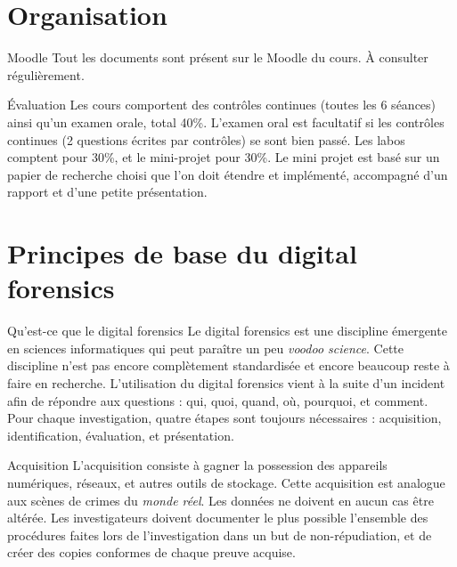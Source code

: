 \documentclass[a4paper]{article}
\begin{document}

	\section{Organisation}
	\begin{parag}{Moodle}
		Tout les documents sont présent sur le Moodle du cours. À consulter régulièrement.
	\end{parag}
	\begin{parag}{Évaluation}
		Les cours comportent des contrôles continues (toutes les 6 séances) ainsi qu'un examen orale, total 40\%. L'examen oral est facultatif si les contrôles continues (2 questions écrites par contrôles) se sont bien passé. Les labos comptent pour 30\%, et le mini-projet pour 30\%. Le mini projet est basé sur un papier de recherche choisi que l'on doit étendre et implémenté, accompagné d'un rapport et d'une petite présentation.
	\end{parag}

	\section{Principes de base du digital forensics}
	\begin{parag}{Qu'est-ce que le digital forensics}
		Le digital forensics est une discipline émergente en sciences informatiques qui peut paraître un peu \emph{voodoo science}. Cette discipline n'est pas encore complètement standardisée et encore beaucoup reste à faire en recherche. L'utilisation du digital forensics vient à la suite d'un incident afin de répondre aux questions : qui, quoi, quand, où, pourquoi, et comment. Pour chaque investigation, quatre étapes sont toujours nécessaires : acquisition, identification, évaluation, et présentation.
	\end{parag}

	\begin{parag}{Acquisition}
		L'acquisition consiste à gagner la possession des appareils numériques, réseaux, et autres outils de stockage. Cette acquisition est analogue aux scènes de crimes du \emph{monde réel}. Les données ne doivent en aucun cas être altérée. Les investigateurs doivent documenter le plus possible l'ensemble des procédures faites lors de l'investigation dans un but de non-répudiation, et de créer des copies conformes de chaque preuve acquise.
	\end{parag}
\end{document}
